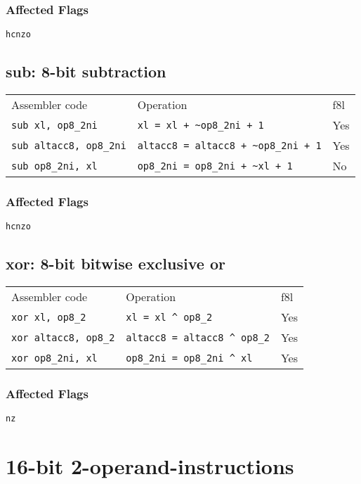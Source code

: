 \documentclass{book}
\begin{document}
\subsubsection*{Affected Flags}

\texttt{hcnzo}


\subsection{sub: 8-bit subtraction}

\begin{tabular}{l l l}
Assembler code                 & Operation                                     & f8l \\
\texttt{sub xl, op8\_2ni}      & \texttt{xl = xl + \~{}op8\_2ni + 1}           & Yes \\
\texttt{sub altacc8, op8\_2ni} & \texttt{altacc8 = altacc8 + \~{}op8\_2ni + 1} & Yes \\
\texttt{sub op8\_2ni, xl}      & \texttt{op8\_2ni = op8\_2ni + \~{}xl + 1}     & No
\end{tabular}

\subsubsection*{Affected Flags}

\texttt{hcnzo}


\subsection{xor: 8-bit bitwise exclusive or}

\begin{tabular}{l l l}
Assembler code               & Operation                              & f8l \\
\texttt{xor xl, op8\_2}      & \texttt{xl = xl \^{} op8\_2}           & Yes \\
\texttt{xor altacc8, op8\_2} & \texttt{altacc8 = altacc8 \^{} op8\_2} & Yes \\
\texttt{xor op8\_2ni, xl}    & \texttt{op8\_2ni = op8\_2ni \^{} xl}   & Yes
\end{tabular}

\subsubsection*{Affected Flags}

\texttt{nz}


\section{16-bit 2-operand-instructions}
\end{document}
